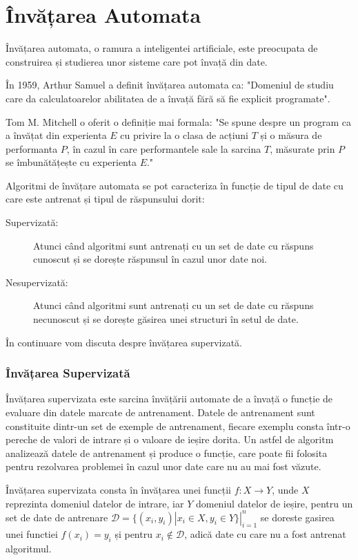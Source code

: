 \chapter{Învățarea Automata}

Învățarea automata, o ramura a inteligentei artificiale, este preocupata de construirea și studierea unor sisteme care pot învață din date.

În 1959, Arthur Samuel a definit învățarea automata ca: "Domeniul de studiu care da calculatoarelor abilitatea de a învață fără să fie explicit programate"\cite{simon2013}.

Tom M. Mitchell o oferit o definiție mai formala: "Se spune despre un program ca a învățat din experienta ${E}$ cu privire la o clasa de acțiuni ${T}$ și o măsura de performanta ${P}$, în cazul în care performantele sale la sarcina ${T}$, măsurate prin ${P}$ se îmbunătățește cu experienta ${E}$."\cite{mitchell97}

Algoritmi de învățare automata se pot caracteriza în funcție de tipul de date cu care este antrenat și tipul de răspunsului dorit:
\begin{description}
	\item[Supervizată:]		
	Atunci când algoritmi sunt antrenați cu un set de date cu răspuns cunoscut și se dorește răspunsul în cazul unor date noi.
	
	\item[Nesupervizată:] 
	Atunci când algoritmi sunt antrenați cu un set de date cu răspuns necunoscut și se dorește găsirea unei structuri în setul de date.
\end{description}

În continuare vom discuta despre învățarea supervizată.

\subsection{Învățarea Supervizată}

Învățarea supervizata este sarcina învățării automate de a învață o funcție de evaluare din datele marcate de antrenament.
Datele de antrenament sunt constituite dintr-un set de exemple de antrenament, fiecare exemplu consta într-o pereche de valori de intrare și o valoare de ieșire dorita. Un astfel de algoritm analizează datele de antrenament și produce o funcție, care poate fii folosita pentru rezolvarea problemei în cazul unor date care nu au mai fost văzute.



Învățarea supervizata consta în învățarea unei funcții \( f:X \rightarrow Y \), unde \(X\) reprezinta domeniul datelor de intrare, iar \(Y\) domeniul datelor de ieșire, pentru un set de date de antrenare ${ \mathcal{D} = \{(x_i,y_i)|x_i \in X, y_i \in Y\}|_{i=1}^n }$ se doreste gasirea unei functiei ${ f(x_i) = y_i }$ și pentru \( x_i \notin \mathcal{D} \), adică date cu care nu a fost antrenat algoritmul.

